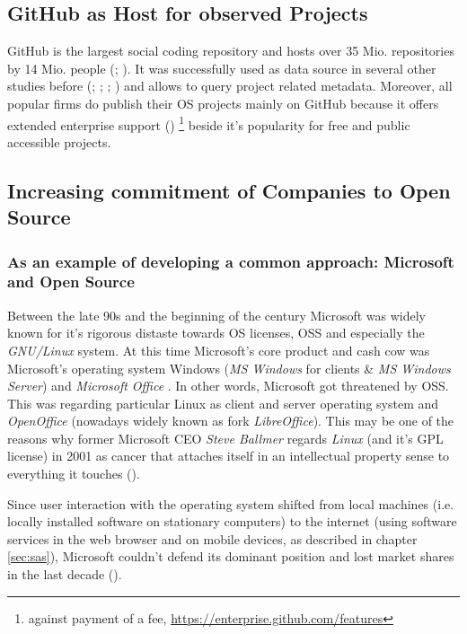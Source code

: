 \subsection{GitHub as Host for observed Projects}

GitHub is the largest social coding repository and hosts over 35 Mio. repositories by 14 Mio. people (\cite{AboutGitHubPress:online}; \cite{HowGitHubConqueredGoogleMicrosoftAndEveryoneElse:online}). It was successfully used as data source in several other studies before (\cite{vasilescu2013stackoverflow}; \cite{tarrell2016GenderBiasInOpenSource}; \cite{dabbish2012social}; \cite{thung2013network}) and allows to query project related metadata. Moreover, all popular firms do publish their OS projects mainly on GitHub because it offers extended enterprise support (\cite{IntroducingGitHubEnterprise:online}) \footnote{against payment of a fee, \url{https://enterprise.github.com/features}} beside it's popularity for free and public accessible projects.

\subsection{Increasing commitment of Companies to Open Source}

\subsubsection{As an example of developing a common approach: Microsoft and Open Source}

Between the late 90s and the beginning of the century Microsoft was widely known for it's rigorous distaste towards OS licenses, OSS and especially the \textit{GNU/Linux} system. At this time Microsoft's core product and cash cow was Microsoft's operating system Windows (\textit{MS Windows} for clients \& \textit{MS Windows Server}) and \textit{Microsoft Office} \cite[p.2]{reifman2007microsoft}. In other words, Microsoft got threatened by OSS. This was regarding particular Linux as client and server operating system and \textit{OpenOffice} (nowadays widely known as fork \textit{LibreOffice}). This may be one of the reasons why former Microsoft CEO \textit{Steve Ballmer} regards \textit{Linux} (and it's GPL license) in 2001 as cancer that attaches itself in an intellectual property sense to everything it touches (\cite{ballmerlinuxcancer:online}).

Since user interaction with the operating system shifted from local machines (i.e. locally installed software on stationary computers) to the internet (using software services in the web browser and on mobile devices, as described in chapter \ref{sec:sas}), Microsoft couldn't defend its dominant position and lost market shares in the last decade (\cite{MicrosoftWindowsOEMandOfficeRevenueIsDownAsCloudGrows:online}).

